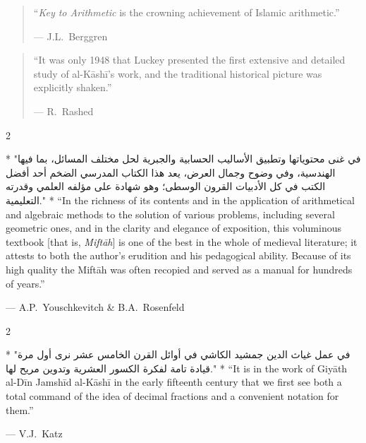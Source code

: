 \documentclass[11pt,a4paper]{article}
\newcommand{\ar}[1]{{\arabicfont\beginR #1\endR}}
\newenvironment{bilingual}{%
  \vspace{0.3em}%
  \begin{paracol}{2}%
}{%
  \end{paracol}%
  \vspace{0.3em}%
}
\begin{document}
\begin{quote}
``\textit{Key to Arithmetic} is the crowning achievement of Islamic
arithmetic.''
\begin{flushright}
--- J.L.\ Berggren
\end{flushright}
\end{quote}

\vspace{0.3cm}

\begin{quote}
``It was only 1948 that Luckey presented the first extensive and
detailed study of al-K\=ash\=i's work, and the traditional historical
picture was explicitly shaken.''
\begin{flushright}
--- R.\ Rashed
\end{flushright}
\end{quote}

\vspace{0.3cm}

\begin{bilingual}
\switchcolumn[0]*
\ar{"في غنى محتوياتها وتطبيق الأساليب الحسابية والجبرية لحل مختلف المسائل، بما فيها الهندسية، وفي وضوح وجمال العرض، يعد هذا الكتاب المدرسي الضخم أحد أفضل الكتب في كل الأدبيات القرون الوسطى؛ وهو شهادة على مؤلفه العلمي وقدرته التعليمية."}
\switchcolumn[1]*
``In the richness of its contents and in the application of
arithmetical and algebraic methods to the solution of various
problems, including several geometric ones, and in the clarity and
elegance of exposition, this voluminous textbook [that is,
\textit{Mift\=ah}] is one of the best in the whole of medieval
literature; it attests to both the author's erudition and his
pedagogical ability. Because of its high quality the Mift\=ah was
often recopied and served as a manual for hundreds of years.''
\begin{flushright}
--- A.P.\ Youschkevitch \& B.A.\ Rosenfeld
\end{flushright}
\end{bilingual}

\vspace{0.3cm}

\begin{bilingual}
\switchcolumn[0]*
\ar{"في عمل غياث الدين جمشيد الكاشي في أوائل القرن الخامس عشر نرى أول مرة قيادة تامة لفكرة الكسور العشرية وتدوين مريح لها."}
\switchcolumn[1]*
``It is in the work of Giy\=ath al-D\=in Jamsh\=id al-K\=ash\=i in the early
fifteenth century that we first see both a total command of the idea
of decimal fractions and a convenient notation for them.''
\begin{flushright}
--- V.J.\ Katz
\end{flushright}
\end{bilingual}
\end{document}
